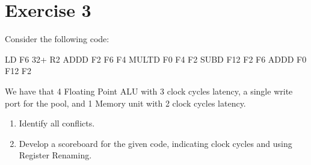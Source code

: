 \section{Exercise 3}

Consider the following code:
\begin{verbnobox}[\verbarg]
LD F6 32+ R2
ADDD F2 F6 F4
MULTD F0 F4 F2
SUBD F12 F2 F6
ADDD F0 F12 F2
\end{verbnobox}
We have that 4 Floating Point ALU with 3 clock cycles latency, a single write port for the pool, and 1 Memory unit with 2 clock cycles latency. 
\begin{enumerate}
    \item Identify all conflicts.
    \item Develop a scoreboard for the given code, indicating clock cycles and using Register Renaming.
\end{enumerate}

